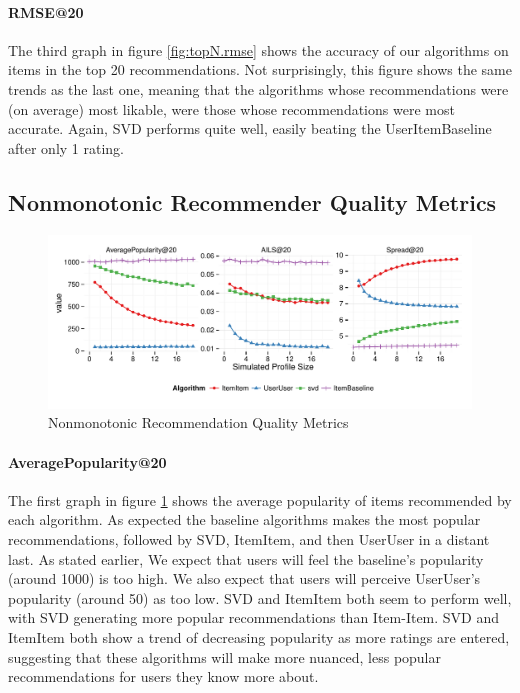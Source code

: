 \documentclass[letterpaper]{sig-alternate}
\begin{document}
  \paragraph{RMSE@20}
  The third graph in figure \ref{fig:topN.rmse} shows the accuracy of our algorithms on items in the top 20 recommendations.
  Not surprisingly, this figure shows the same trends as the last one, meaning that the algorithms whose recommendations were (on average) most likable, were those whose recommendations were most accurate.
  Again, SVD performs quite well, easily beating the UserItemBaseline after only 1 rating.
  


\subsection*{Nonmonotonic Recommender Quality Metrics}

\begin{figure}[ht!]
  \centering
  \includegraphics[width=\linewidth]{../lenskit/output/ekstrandTuned20/popdiv.pdf}
  \caption{Nonmonotonic Recommendation Quality Metrics}
  \label{fig:pop}
\end{figure}

  \paragraph{AveragePopularity@20}
  The first graph in figure \ref{fig:pop} shows the average popularity of items recommended by each algorithm.
  As expected the baseline algorithms makes the most popular recommendations, followed by SVD, ItemItem, and then UserUser in a distant last.
  As stated earlier, We expect that users will feel the baseline's popularity (around 1000) is too high.
  We also expect that users will perceive UserUser's popularity (around 50) as too low.
  SVD and ItemItem both seem to perform well, with SVD generating more popular recommendations than Item-Item.
  SVD and ItemItem both show a trend of decreasing popularity as more ratings are entered, suggesting that these algorithms will make more nuanced, less popular recommendations for users they know more about.
\end{document}
